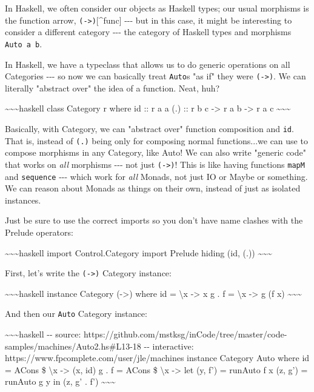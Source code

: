 \documentclass[]{article}
\begin{document}
In Haskell, we often consider our objects as Haskell types; our usual morphisms
is the function arrow, \texttt{(-\textgreater{})}{[}\^{}func{]} -\/-\/- but in
this case, it might be interesting to consider a different category -\/-\/- the
category of Haskell types and morphisms \texttt{Auto\ a\ b}.

In Haskell, we have a typeclass that allows us to do generic operations on all
Categories -\/-\/- so now we can basically treat \texttt{Auto}s "as if" they
were \texttt{(-\textgreater{})}. We can literally "abstract over" the idea of a
function. Neat, huh?

\textasciitilde{}\textasciitilde{}\textasciitilde{}haskell class Category r
where id :: r a a (.) :: r b c -\textgreater{} r a b -\textgreater{} r a c
\textasciitilde{}\textasciitilde{}\textasciitilde{}

Basically, with Category, we can "abstract over" function composition and
\texttt{id}. That is, instead of \texttt{(.)} being only for composing normal
functions...we can use to compose morphisms in any Category, like Auto! We can
also write "generic code" that works on \emph{all} morphisms -\/-\/- not just
\texttt{(-\textgreater{})}! This is like having functions \texttt{mapM} and
\texttt{sequence} -\/-\/- which work for \emph{all} Monads, not just IO or Maybe
or something. We can reason about Monads as things on their own, instead of just
as isolated instances.

Just be sure to use the correct imports so you don't have name clashes with the
Prelude operators:

\textasciitilde{}\textasciitilde{}\textasciitilde{}haskell import
Control.Category import Prelude hiding (id, (.))
\textasciitilde{}\textasciitilde{}\textasciitilde{}

First, let's write the \texttt{(-\textgreater{})} Category instance:

\textasciitilde{}\textasciitilde{}\textasciitilde{}haskell instance Category
(-\textgreater{}) where id = \textbackslash{}x -\textgreater{} x g . f =
\textbackslash{}x -\textgreater{} g (f x)
\textasciitilde{}\textasciitilde{}\textasciitilde{}

And then our \texttt{Auto} Category instance:

\textasciitilde{}\textasciitilde{}\textasciitilde{}haskell -\/- source:
https://github.com/mstksg/inCode/tree/master/code-samples/machines/Auto2.hs\#L13-18
-\/- interactive: https://www.fpcomplete.com/user/jle/machines instance Category
Auto where id = ACons \$ \textbackslash{}x -\textgreater{} (x, id) g . f = ACons
\$ \textbackslash{}x -\textgreater{} let (y, f') = runAuto f x (z, g') = runAuto
g y in (z, g' . f') \textasciitilde{}\textasciitilde{}\textasciitilde{}
\end{document}
